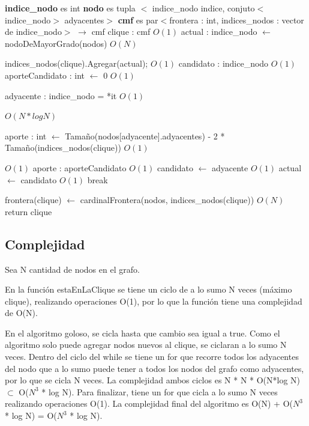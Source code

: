 \documentclass[a4paper, 10pt, twoside]{article}
\newenvironment{pseudo}[1][]{%
    \vspace{1em}%
    \begin{algorithmic}%
}
{%
    \end{algorithmic}%
    \vspace{1em}%
}
\newcommand{\Ode}[1]{\hfill $O(#1)$}
\begin{document}
\begin{pseudo}
\State \textbf{indice\_nodo} es int
\State \textbf{nodo} es tupla $<$ indice\_nodo indice, conjuto$<$indice\_nodo$>$ adyacentes$>$
\State \textbf{cmf} es par$<$frontera : int, indices\_nodos : vector de indice\_nodo$>$
\State
{} $\rightarrow$ cmf
	\State clique : cmf														\Ode{1}
	\State actual : indice\_nodo $\leftarrow$ nodoDeMayorGrado(nodos)		\Ode{N}

	 	\State indices\_nodos(clique).Agregar(actual);						\Ode{1}
	 	\State candidato : indice\_nodo										\Ode{1}
		\State aporteCandidato : int $\leftarrow$ 0							\Ode{1}


	 		\State adyacente : indice\_nodo = *it							\Ode{1}
	 		
	 					\Ode{N*log N}

	 			\State aporte : int $\leftarrow$ Tamaño(nodos[adyacente].adyacentes) -
	 					     2 * Tamaño(indices\_nodos(clique))				\Ode{1}

	 											\Ode{1}
	 				\State aporte : aporteCandidato							\Ode{1}
	 				\State candidato $\leftarrow$ adyacente					\Ode{1}
	 			\EndIf
	 		\EndIf
	 	\EndFor
	 	 actual $\leftarrow$ candidato			\Ode{1}
	 	\Else
	 		\State break
	 	\EndIf
	\EndWhile

	\State frontera(clique) $\leftarrow$ cardinalFrontera(nodos, indices\_nodos(clique)) \Ode{N}
	\State return clique
\EndProcedure
\end{pseudo}

\subsection{Complejidad}
Sea N cantidad de nodos en el grafo.

En la función estaEnLaClique se tiene un ciclo de a lo sumo N veces (máximo clique), realizando operaciones O(1), por lo que la función tiene una complejidad de O(N).

En el algoritmo goloso, se cicla hasta que cambio sea igual a true. Como el algoritmo solo puede agregar nodos nuevos al clique, se ciclaran a lo sumo N veces.
Dentro del ciclo del while se tiene un for que recorre todos los adyacentes del nodo que a lo sumo puede tener a todos los nodos del grafo como adyacentes, por lo que se cicla N veces.
La complejidad ambos ciclos es N * N * O(N*log N) $\subset$ O($N^3$ * log N).
Para finalizar, tiene un for que cicla a lo sumo N veces realizando operaciones O(1).
La complejidad final del algoritmo es O(N) + O($N^3$ * log N) = O($N^3$ * log N).
\end{document}
